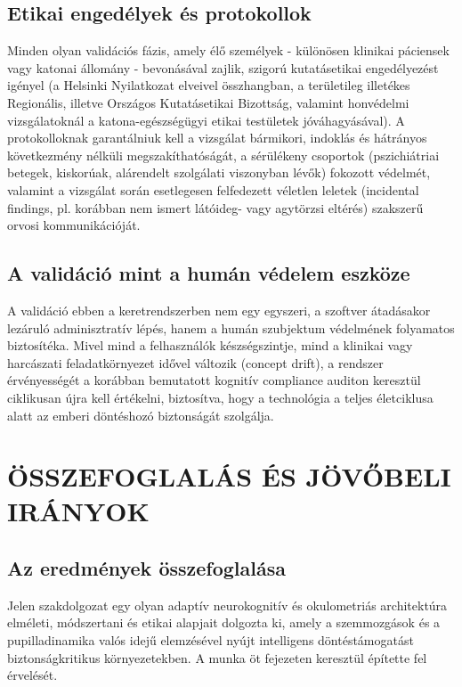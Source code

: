 \documentclass[12pt,a4paper,oneside]{book}
\begin{document}
\subsection{Etikai engedélyek és protokollok}

Minden olyan validációs fázis, amely élő személyek - különösen klinikai páciensek vagy katonai állomány - bevonásával zajlik, szigorú kutatásetikai engedélyezést igényel (a Helsinki Nyilatkozat elveivel összhangban, a területileg illetékes Regionális, illetve Országos Kutatásetikai Bizottság, valamint honvédelmi vizsgálatoknál a katona-egészségügyi etikai testületek jóváhagyásával). A protokolloknak garantálniuk kell a vizsgálat bármikori, indoklás és hátrányos következmény nélküli megszakíthatóságát, a sérülékeny csoportok (pszichiátriai betegek, kiskorúak, alárendelt szolgálati viszonyban lévők) fokozott védelmét, valamint a vizsgálat során esetlegesen felfedezett véletlen leletek (incidental findings, pl. korábban nem ismert látóideg- vagy agytörzsi eltérés) szakszerű orvosi kommunikációját.

\subsection{A validáció mint a humán védelem eszköze}

A validáció ebben a keretrendszerben nem egy egyszeri, a szoftver átadásakor lezáruló adminisztratív lépés, hanem a humán szubjektum védelmének folyamatos biztosítéka. Mivel mind a felhasználók készségszintje, mind a klinikai vagy harcászati feladatkörnyezet idővel változik (concept drift), a rendszer érvényességét a korábban bemutatott kognitív compliance auditon keresztül ciklikusan újra kell értékelni, biztosítva, hogy a technológia a teljes életciklusa alatt az emberi döntéshozó biztonságát szolgálja.

\section{ÖSSZEFOGLALÁS ÉS JÖVŐBELI IRÁNYOK}

\subsection{Az eredmények összefoglalása}

Jelen szakdolgozat egy olyan adaptív neurokognitív és okulometriás architektúra elméleti, módszertani és etikai alapjait dolgozta ki, amely a szemmozgások és a pupilladinamika valós idejű elemzésével nyújt intelligens döntéstámogatást biztonságkritikus környezetekben. A munka öt fejezeten keresztül építette fel érvelését.
\end{document}
